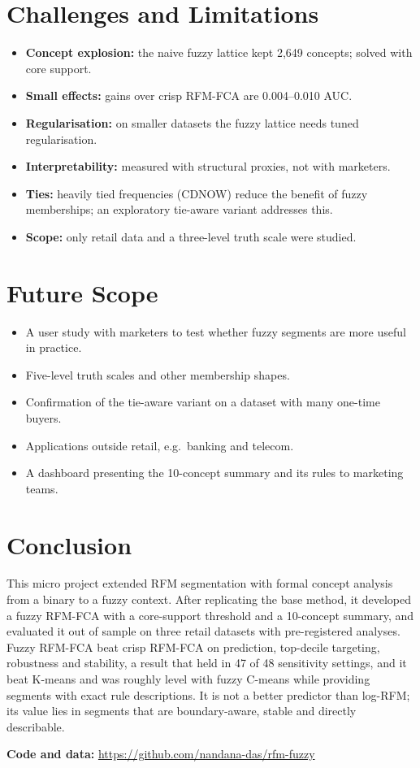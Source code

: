 \documentclass[11pt,a4paper]{article}
\begin{document}
\section{Challenges and Limitations}
\begin{itemize}
\item \textbf{Concept explosion:} the naive fuzzy lattice kept 2,649 concepts; solved with core support.
\item \textbf{Small effects:} gains over crisp RFM-FCA are 0.004--0.010 AUC.
\item \textbf{Regularisation:} on smaller datasets the fuzzy lattice needs tuned regularisation.
\item \textbf{Interpretability:} measured with structural proxies, not with marketers.
\item \textbf{Ties:} heavily tied frequencies (CDNOW) reduce the benefit of fuzzy memberships; an exploratory tie-aware variant addresses this.
\item \textbf{Scope:} only retail data and a three-level truth scale were studied.
\end{itemize}

\section{Future Scope}
\begin{itemize}
\item A user study with marketers to test whether fuzzy segments are more useful in practice.
\item Five-level truth scales and other membership shapes.
\item Confirmation of the tie-aware variant on a dataset with many one-time buyers.
\item Applications outside retail, e.g.\ banking and telecom.
\item A dashboard presenting the 10-concept summary and its rules to marketing teams.
\end{itemize}

\section{Conclusion}
This micro project extended RFM segmentation with formal concept analysis from a binary to a fuzzy context. After replicating the base method, it developed a fuzzy RFM-FCA with a core-support threshold and a 10-concept summary, and evaluated it out of sample on three retail datasets with pre-registered analyses. Fuzzy RFM-FCA beat crisp RFM-FCA on prediction, top-decile targeting, robustness and stability, a result that held in 47 of 48 sensitivity settings, and it beat K-means and was roughly level with fuzzy C-means while providing segments with exact rule descriptions. It is not a better predictor than log-RFM; its value lies in segments that are boundary-aware, stable and directly describable.

\vspace{1em}
\noindent\textbf{Code and data:} \url{https://github.com/nandana-das/rfm-fuzzy}



\end{document}
